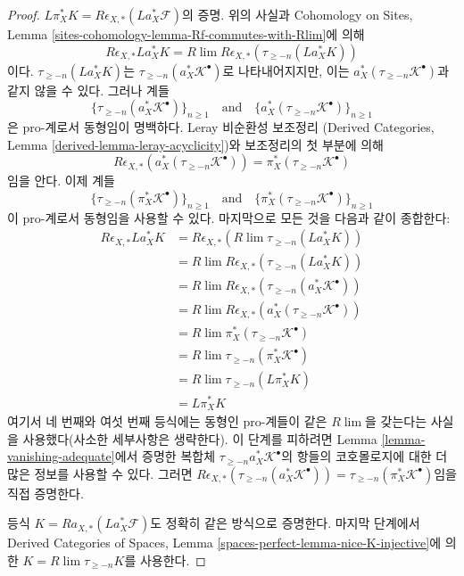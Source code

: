 \begin{proof}
\medskip\noindent
$L\pi_X^*K = R\epsilon_{X, *}(La_X^*\mathcal{F})$의 증명.
위의 사실과 Cohomology on Sites, Lemma
\ref{sites-cohomology-lemma-Rf-commutes-with-Rlim}에 의해
$$
R\epsilon_{X, *}La_X^*K =
R\lim R\epsilon_{X, *}(\tau_{\geq -n}(La_X^*K))
$$
이다. $\tau_{\geq -n}(La_X^*K)$는
$\tau_{\geq -n}(a_X^*\mathcal{K}^\bullet)$로 나타내어지지만,
이는 $a_X^*(\tau_{\geq -n}\mathcal{K}^\bullet)$과 같지 않을 수 있다.
그러나 계들
$$
\{\tau_{\geq -n}(a_X^*\mathcal{K}^\bullet)\}_{n \geq 1}
\quad\text{and}\quad
\{a_X^*(\tau_{\geq -n}\mathcal{K}^\bullet)\}_{n \geq 1}
$$
은 pro-계로서 동형임이 명백하다. Leray 비순환성 보조정리
(Derived Categories, Lemma \ref{derived-lemma-leray-acyclicity})와
보조정리의 첫 부분에 의해
$$
R\epsilon_{X, *}(a_X^*(\tau_{\geq -n}\mathcal{K}^\bullet)) =
\pi_X^*(\tau_{\geq -n}\mathcal{K}^\bullet)
$$
임을 안다. 이제 계들
$$
\{\tau_{\geq -n}(\pi_X^*\mathcal{K}^\bullet)\}_{n \geq 1}
\quad\text{and}\quad
\{\pi_X^*(\tau_{\geq -n}\mathcal{K}^\bullet)\}_{n \geq 1}
$$
이 pro-계로서 동형임을 사용할 수 있다. 마지막으로 모든 것을 다음과
같이 종합한다:
\begin{align*}
R\epsilon_{X, *}La_X^*K
& =
R\epsilon_{X, *} (R\lim \tau_{\geq -n}(La_X^*K)) \\
& =
R\lim R\epsilon_{X, *}(\tau_{\geq -n}(La_X^*K)) \\
& =
R\lim R\epsilon_{X, *}(\tau_{\geq -n}(a_X^*\mathcal{K}^\bullet)) \\
& =
R\lim R\epsilon_{X, *}(a_X^*(\tau_{\geq -n}\mathcal{K}^\bullet)) \\
& =
R\lim \pi_X^*(\tau_{\geq -n}\mathcal{K}^\bullet) \\
& =
R\lim \tau_{\geq -n}(\pi_X^*\mathcal{K}^\bullet) \\
& =
R\lim \tau_{\geq -n}(L\pi_X^*K) \\
& =
L\pi_X^*K
\end{align*}
여기서 네 번째와 여섯 번째 등식에는 동형인 pro-계들이 같은
$R\lim$을 갖는다는 사실을 사용했다(사소한 세부사항은 생략한다).
이 단계를 피하려면 Lemma \ref{lemma-vanishing-adequate}에서 증명한
복합체 $\tau_{\geq -n}a_X^*\mathcal{K}^\bullet$의 항들의 코호몰로지에
대한 더 많은 정보를 사용할 수 있다. 그러면
$R\epsilon_{X, *}(\tau_{\geq -n}(a_X^*\mathcal{K}^\bullet)) =
\tau_{\geq -n}(\pi_X^*\mathcal{K}^\bullet)$임을 직접 증명한다.

\medskip\noindent
등식 $K = Ra_{X, *}(La_X^*\mathcal{F})$도 정확히 같은 방식으로
증명한다. 마지막 단계에서 Derived Categories of Spaces, Lemma
\ref{spaces-perfect-lemma-nice-K-injective}에 의한
$K = R\lim \tau_{\geq -n}K$를 사용한다.
\end{proof}



